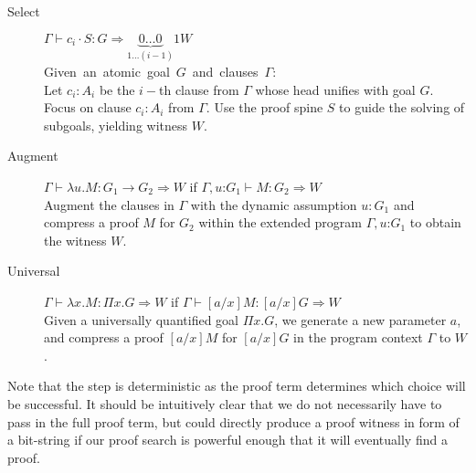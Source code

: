 \documentclass{llncs}
\newcommand{\fighead}{\hrule\vspace{1.5ex}}
\newcommand{\vd}{\vdash}
\newcommand{\arrow}{\rightarrow}
\newcommand{\oftp}{\mathord{:}}
\begin{document}
\begin{small}
\begin{description}
\item[Select] $\Gamma \vd c_i \cdot S: G \Rightarrow
  \underset{1 \ldots (i-1)}{\underbrace{0\ldots 0}}1
W $ \\
    \mbox{Given an atomic goal $G$ and clauses $\Gamma$:}\hfill\\
     Let $c_i : A_i$ be the $i-$th clause from $\Gamma$ whose head 
     unifies with goal $G$.\\
    Focus on clause $c_i : A_i$ from $\Gamma$. Use the proof spine $S$ 
    to guide the solving of subgoals, yielding witness $W$.

\item[Augment] $\Gamma \vd   \lambda u. M : G_1 \arrow G_2 \Rightarrow
  W$ if $\Gamma,
  u\oftp G_1 \vd M : G_2 \Rightarrow W$ \\
Augment the clauses in $\Gamma$ with the dynamic assumption $u{:} G_1$ and
compress a proof $M$ for $G_2$ within the extended program
$\Gamma, u \oftp G_1$ to obtain the witness $W$. 

\item[Universal] $\Gamma \vd  \lambda x. M : \Pi x. G \Rightarrow W$ if $\Gamma \vd
  [a/x]M: [a/x]G\Rightarrow W$  \\ %
Given a universally quantified goal $\Pi x. G$, we generate a new
parameter $a$, and compress a proof $[a/x]M$  for $[a/x]G$ in the
program context $\Gamma$ to $W$.

\end{description}
\end{small}    
%

Note that the {} step is deterministic as the proof term
determines which choice will be successful. It should be intuitively
clear that we do not necessarily have to pass in the full proof term,
but could directly produce a proof witness in form of a bit-string if
our proof search is powerful enough that it will eventually find a
proof.
\end{document}
